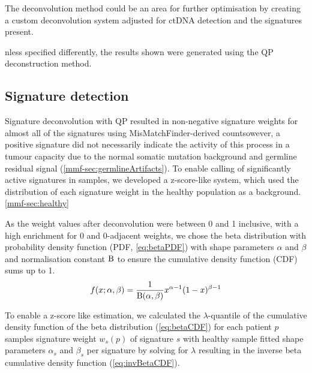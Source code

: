 The deconvolution method could be an area for further optimisation by creating a custom deconvolution system adjusted for ctDNA detection and the signatures present.

nless specified differently, the results shown  were generated using the QP deconstruction method.



\subsection{Signature detection}
\label{mmf-sec:sigdetection}
Signature deconvolution with QP resulted in non-negative signature weights for almost all of the signatures  using MisMatchFinder-derived countsowever, a positive signature did not necessarily indicate the activity of this process in a tumour capacity due to the normal somatic mutation background and germline residual signal (\autoref{mmf-sec:germlineArtifacts}). To enable  calling of significantly active signatures in samples, we developed a z-score-like system, which used the distribution of each signature weight in the healthy population as a background. \autoref{mmf-sec:healthy}

As the weight values after deconvolution were between 0 and 1 inclusive, with a high enrichment for 0 and 0-adjacent weights, we chose the beta distribution with probability density function (PDF, \autoref{eq:betaPDF}) with shape parameters $\alpha$ and $\beta$ and normalisation constant $\mathrm{B}$ to ensure the cumulative density function (CDF) sums up to 1. 
\begin{equation}
f(x; \alpha ,\beta)= \frac{1}{\mathrm{B}(\alpha, \beta)} x^{\alpha-1}(1-x)^{\beta-1}
\label{eq:betaPDF}
\end{equation}
\myequation[\ref{eq:betaPDF}]{Beta distribution probability density function}

To enable a z-score like estimation, we calculated the $\lambda$-quantile of the cumulative density function of the beta distribution (\autoref{eq:betaCDF}) for each patient $p$ samples signature weight $w_s(p)$ of signature $s$ with healthy sample fitted shape parameters $\alpha_s$ and $\beta_s$ per signature by solving  for $\lambda$ resulting in the inverse beta cumulative density function (\autoref{eq:invBetaCDF}). 

